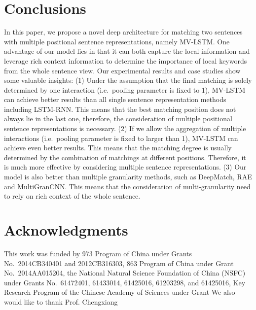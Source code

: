 \documentclass[letterpaper]{article}
\begin{document}
\section{Conclusions}
In this paper, we propose a novel deep architecture for matching two sentences with multiple positional sentence representations, namely MV-LSTM. One advantage of our model lies in that it can both capture the local information and leverage rich context information to determine the importance of local keywords from the whole sentence view. Our experimental results and case studies show some valuable insights: (1) Under the assumption that the final matching is solely determined by one interaction (i.e.~pooling parameter is fixed to 1), MV-LSTM can achieve better results than all single sentence representation methods including LSTM-RNN. This means that the best matching position does not always lie in the last one, therefore, the consideration of multiple positional sentence representations is necessary. (2) If we allow the aggregation of multiple interactions (i.e.~pooling parameter is fixed to larger than 1), MV-LSTM can achieve even better results. This means that the matching degree is usually determined by the combination of matchings at different positions. Therefore, it is much more effective by considering multiple sentence representations. (3) Our model is also better than multiple granularity methods, such as DeepMatch, RAE and MultiGranCNN. This means that the consideration of multi-granularity need to rely on rich context of the whole sentence.


\section{Acknowledgments}
This work was funded by 973 Program of China under Grants No.~2014CB340401 and 2012CB316303, 863 Program of China under Grant No.~2014AA015204, the National Natural Science Foundation of China (NSFC) under Grants No.~61472401, 61433014, 61425016, 61203298, and 61425016, Key Research Program of the Chinese Academy of Sciences under Grant
We also would like to thank Prof. Chengxiang

\clearpage

\end{document}
